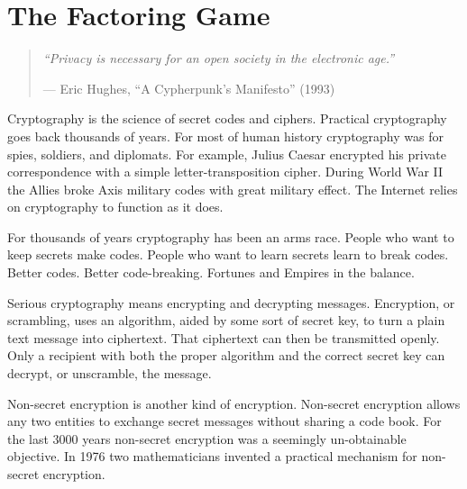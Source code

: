 
\chapter{The Factoring Game}
\label{pos09:the-factoring-game}


\begin{quote}\small
\textit{``Privacy is necessary for an open society in the electronic age.''}

\hfill --- Eric Hughes, ``A Cypherpunk's Manifesto'' (1993)
\end{quote}

\vspace{0.5cm}


Cryptography is the science of secret codes and ciphers. Practical cryptography goes back thousands of years.  For most of human history cryptography was for spies, soldiers, and diplomats.  For example, Julius Caesar encrypted his private correspondence with a simple letter-transposition cipher.  During World War II the Allies broke Axis military codes with great military effect.  The Internet relies on cryptography to function as it does.

For thousands of years cryptography has been an arms race.  People who want to keep secrets make codes.  People who want to learn secrets learn to break codes.   Better codes.  Better code-breaking.  Fortunes and Empires in the balance.

Serious cryptography means encrypting and decrypting messages.  Encryption, or scrambling, uses an algorithm, aided by some sort of secret key, to turn a plain text message into ciphertext.  That ciphertext can then be transmitted openly.  Only a recipient with both the proper algorithm and the correct secret key can decrypt, or unscramble, the message.

Non-secret encryption is another kind of encryption.  Non-secret encryption allows any two entities to exchange secret messages without sharing a code book.  For the last 3000 years non-secret encryption was a seemingly un-obtainable objective.   In 1976 two mathematicians invented a practical mechanism for non-secret encryption.


